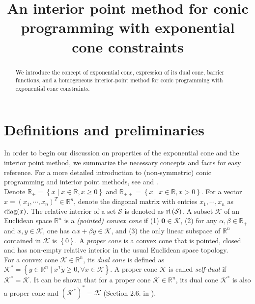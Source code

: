 \documentclass[10pt]{article}
\title{An interior point method for conic programming with exponential cone constraints}
\theoremstyle{definition}
\theoremstyle{plain}
\def\interior{\protect{\textnormal{ri}}}
\def\diagonal{\protect{\textnormal{diag}}}
\begin{document}
\maketitle

\begin{abstract}
We introduce the concept of exponential cone, expression of its dual cone, barrier functions, and a homogeneous interior-point method for conic programming with exponential cone constraints.
\end{abstract}

\section{Definitions and preliminaries}
In order to begin our discussion on properties of the exponential cone and the interior point method, we summarize the necessary concepts and facts for easy reference. For a more detailed introduction to (non-symmetric) conic programming and interior point methods, see \cite{Robert_thesis} and \cite{Akle_thesis}.\\

Denote $\mathbb{R}_+ = \left\{x \mid x\in \mathbb{R}, x\geq 0\right\}$ and $\mathbb{R}_{++} = \left\{x \mid x\in \mathbb{R}, x> 0\right\}$. For a vector $x = (x_1, \cdots, x_n)^T \in \mathbb{R}^n$, denote the diagonal matrix with entries $x_1, \cdots, x_n$ as $\diagonal(x)$. The relative interior of a set $\mathcal{S}$ is denoted as $\interior\left(\mathcal{S}\right)$. A subset $\mathcal{K}$ of an Euclidean space $\mathbb{R}^n$ is a \textit{(pointed) convex cone} if (1) $\mathbf{0} \in \mathcal{K}$, (2) for any $\alpha, \beta \in \mathbb{R}_+$ and $x,y \in \mathcal{K}$, one has $\alpha x + \beta y \in \mathcal{K}$, and (3) the only linear subspace of $\mathbb{R}^n$ contained in $\mathcal{K}$ is $\left\{0\right\}$. A \textit{proper cone} is a convex cone that is pointed, closed and has non-empty relative interior in the usual Euclidean space topology.\\

For a convex cone $\mathcal{K} \in \mathbb{R}^n$, its \textit{dual cone} is defined as 
$\mathcal{K}^* = \left\{y\in \mathbb{R}^n \mid x^T y\geq 0, \forall x \in \mathcal{K} \right\}$. A proper cone $\mathcal{K}$ is called \textit{self-dual} if $\mathcal{K}^* = \mathcal{K}$. It can be shown that for a proper cone $\mathcal{K} \in \mathbb{R}^n$, its dual cone $\mathcal{K}^*$ is also a proper cone and $(\mathcal{K}^*)^* = \mathcal{K}$ (Section 2.6. in \cite{Boyd_Vander_Convex_Opt_Book}). \\
\end{document}
